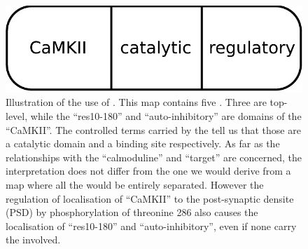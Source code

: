 \begin{figure}[H]
  \centering
  \includegraphics[scale = 0.5]{examples/ex-domain}
  \caption{Illustration of the use of . This map contains five . Three are top-level, while the  ``res10-180'' and ``auto-inhibitory'' are domains of the  ``CaMKII''. The controlled terms carried by the  tell us that those  are a catalytic domain and a binding site respectively.	As far as the relationships with the  ``calmoduline'' and ``target'' are concerned, the interpretation does not differ from the one we would derive from a map where all the  would be entirely separated. However the regulation of localisation of ``CaMKII'' to the post-synaptic densite (PSD) by phosphorylation of threonine 286 also causes the localisation of ``res10-180'' and ``auto-inhibitory'', even if none carry the  involved.}
  \label{fig:ex-domain}
\end{figure}
